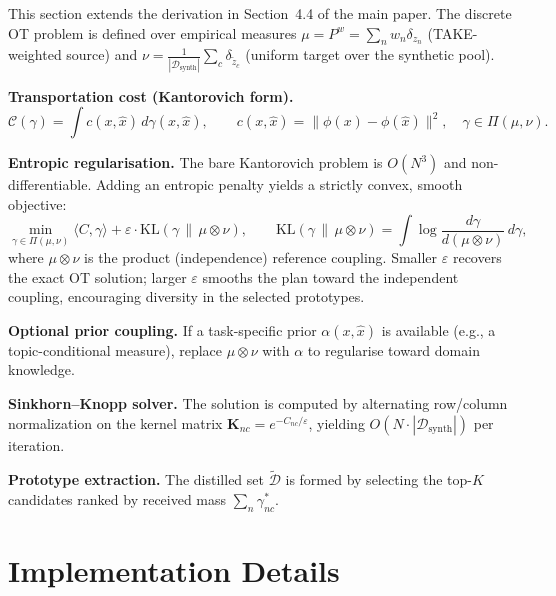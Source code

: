 \documentclass[runningheads]{llncs}
\newcommand*{\eg}{e.g.}
\begin{document}
This section extends the derivation in Section~4.4 of the main paper.
The discrete OT problem is defined over empirical measures $\mu = P^w = \sum_n w_n \delta_{z_n}$ (TAKE-weighted source) and $\nu = \frac{1}{|\mathcal{D}_\text{synth}|}\sum_c \delta_{\tilde{z}_c}$ (uniform target over the synthetic pool).

\textbf{Transportation cost (Kantorovich form).}
\begin{equation}
    \mathcal{C}(\gamma)
    = \int c(x,\hat{x})\,d\gamma(x,\hat{x}),
    \qquad c(x,\hat{x}) = \|\phi(x) - \phi(\hat{x})\|^2,
    \quad \gamma \in \Pi(\mu,\nu).
\end{equation}

\textbf{Entropic regularisation.}
The bare Kantorovich problem is $O(N^3)$ and non-differentiable.
Adding an entropic penalty yields a strictly convex, smooth objective:
\begin{equation}
    \min_{\gamma \in \Pi(\mu,\nu)}
    \langle C, \gamma \rangle
    + \varepsilon \cdot \mathrm{KL}(\gamma \,\|\, \mu \otimes \nu),
    \qquad
    \mathrm{KL}(\gamma \,\|\, \mu \otimes \nu)
    = \int \log\frac{d\gamma}{d(\mu \otimes \nu)}\,d\gamma,
\end{equation}
where $\mu \otimes \nu$ is the product (independence) reference coupling.
Smaller $\varepsilon$ recovers the exact OT solution; larger $\varepsilon$ smooths the plan toward the independent coupling, encouraging diversity in the selected prototypes.

\textbf{Optional prior coupling.}
If a task-specific prior $\alpha(x,\hat{x})$ is available (\eg, a topic-conditional measure), replace $\mu \otimes \nu$ with $\alpha$ to regularise toward domain knowledge.

\textbf{Sinkhorn--Knopp solver.}
The solution is computed by alternating row/column normalization on the kernel matrix $\mathbf{K}_{nc} = e^{-C_{nc}/\varepsilon}$, yielding $O(N \cdot |\mathcal{D}_\text{synth}|)$ per iteration.

\textbf{Prototype extraction.}
The distilled set $\tilde{\mathcal{D}}$ is formed by selecting the top-$K$ candidates ranked by received mass $\sum_n \gamma^*_{nc}$.


\section{Implementation Details}
\label{app:expts}
\end{document}
